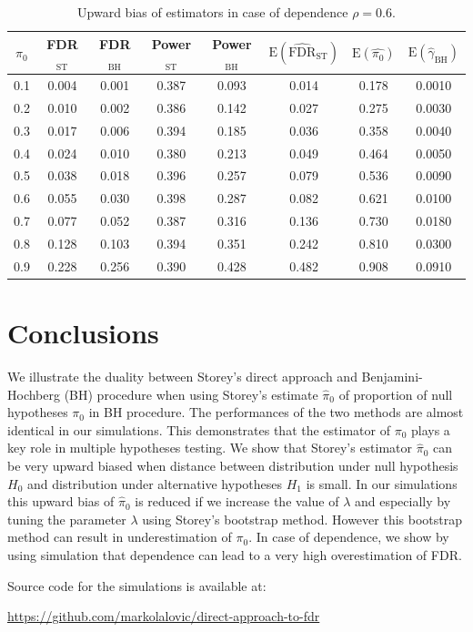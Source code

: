 \documentclass[10pt]{article}
\begin{document}
\begin{table}[H]
	\centering	
	\begin{tabular}{cccccccc}
		$\pi_{0}$ & FDR$_{\text{ST}}$ & FDR$_{\text{BH}}$ & Power$_{\text{ST}}$ & Power$_{\text{BH}}$ & $\text{E} (\widehat{\text{FDR}}_{\text{ST}} )$ & $\text{E}(\widehat{\pi_{0}})$ & $\text{E}(\widehat{\gamma}_{\text{BH}})$ \\ 
		  \hline
		0.1 & 0.004 & 0.001 & 0.387 & 0.093 & 0.014 & 0.178 & 0.0010 \\ 
		0.2 & 0.010 & 0.002 & 0.386 & 0.142 & 0.027 & 0.275 & 0.0030 \\ 
		0.3 & 0.017 & 0.006 & 0.394 & 0.185 & 0.036 & 0.358 & 0.0040 \\ 
		0.4 & 0.024 & 0.010 & 0.380 & 0.213 & 0.049 & 0.464 & 0.0050 \\ 
		0.5 & 0.038 & 0.018 & 0.396 & 0.257 & 0.079 & 0.536 & 0.0090 \\ 
		0.6 & 0.055 & 0.030 & 0.398 & 0.287 & 0.082 & 0.621 & 0.0100 \\ 
		0.7 & 0.077 & 0.052 & 0.387 & 0.316 & 0.136 & 0.730 & 0.0180 \\ 
		0.8 & 0.128 & 0.103 & 0.394 & 0.351 & 0.242 & 0.810 & 0.0300 \\ 
		0.9 & 0.228 & 0.256 & 0.390 & 0.428 & 0.482 & 0.908 & 0.0910 \\ 
		\hline
	\end{tabular}
	\caption{Upward bias of estimators in case of dependence $\rho = 0.6$.}
	\label{tab: dependence}	
\end{table}

\section{Conclusions}
We illustrate the duality between Storey's direct approach and Benjamini-Hochberg (BH) procedure when using Storey's estimate $\widehat{\pi}_{0}$ of proportion of null hypotheses $\pi_{0}$ in BH procedure. The performances of the two methods are almost identical in our simulations. This demonstrates that the estimator of $\pi_{0}$ plays a key role in multiple hypotheses testing. We show that Storey's estimator $\widehat{\pi}_{0}$ can be very upward biased when distance between distribution under null hypothesis $H_{0}$ and distribution under alternative hypotheses $H_{1}$ is small. In our simulations this upward bias of $\widehat{\pi}_{0}$ is reduced if we increase the value of $\lambda$ and especially by tuning the parameter $\lambda$ using Storey's bootstrap method. However this bootstrap method can result in underestimation of $\pi_{0}$. In case of dependence, we show by using simulation that dependence can lead to a very high overestimation of FDR.

Source code for the simulations is available at:

\url{https://github.com/markolalovic/direct-approach-to-fdr}



\end{document}
